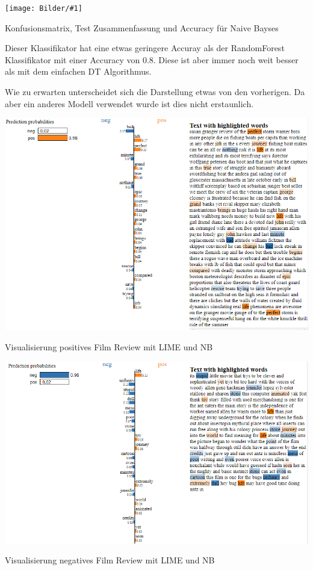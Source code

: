 \documentclass[
  12pt, %
  a4paper, %
  oneside, %
  openany, 
  numbers=noenddot, %
  BCOR=5mm, %
  parskip=half*, %
  thesis, %
]{bfhbook}
\newcommand{\imgText}[3]{
\begin{center}
    \begin{minipage}[t]{0.6\textwidth}
    		\vspace{0pt}
		\texttt{[image: Bilder/\#1]}
		\caption{#2}
	\end{minipage}\hfill
    \begin{minipage}[t]{0.4\textwidth}
    		\vspace{5pt}
  		#3
    \end{minipage}
\end{center}
}
\begin{document}
\imgText{MovieReview-NB-Accuracy.PNG}{Konfusionsmatrix, Test Zusammenfassung und Accuracy für Naive Bayses}{
Dieser Klassifikator hat eine etwas geringere Accuray als der RandomForest Klassifikator mit einer Accuracy von 0.8. Diese ist aber immer noch weit besser als mit dem einfachen \Gls{DT} Algorithmus.
}
Wie zu erwarten unterscheidet sich die Darstellung etwas von den vorherigen. Da aber ein anderes Modell verwendet wurde ist dies nicht erstaunlich.
\begin{center}
    \begin{minipage}[t]{0.45\textwidth}
    		\vspace{0pt}
		\includegraphics[width=\textwidth, left]{Bilder/MovieReview-NaiveBayes-Display-413.PNG}
		\caption{Visualisierung positives Film Review mit LIME und NB}
	\end{minipage}\hfill
    \begin{minipage}[t]{0.45\textwidth}
    		\vspace{0pt}
  		\includegraphics[width=\textwidth, left]{Bilder/MovieReview-NaiveBayes-Display-414.PNG}
		\caption{Visualisierung negatives Film Review mit LIME und NB}
    \end{minipage}
\end{center}
\end{document}
